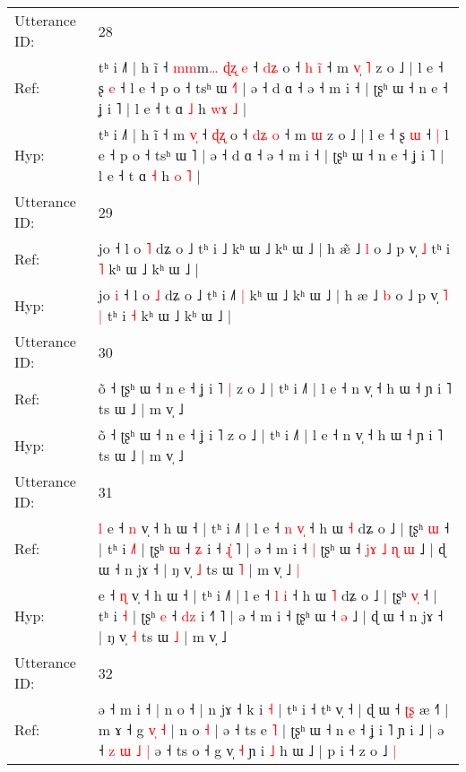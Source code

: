 \documentclass[10pt]{article}
\DeclareRobustCommand{\hl}[1]{{\textcolor{red}{#1}}}
\begin{document}
\begin{longtable}{ll}
 \\
\midrule
Utterance ID: & 28 \\
Ref: & tʰ i ˩˥ | h ĩ ˧ \hl{m}\hl{m}m\hl{…} \hl{ɖ}\hl{ʐ}\hl{ }\hl{e} ˧ \hl{d}\hl{ʑ} o ˧ \hl{h}\hl{ }\hl{i}\hl{̃} ˧ m\hl{ }\hl{v}\hl{̩} \hl{˥} z o ˩ | l e ˧ ʂ \hl{e} ˧\hl{}\hl{} l e ˧ p o ˧ tsʰ ɯ \hl{˧}˥ | ə ˧ d ɑ ˧ ə ˧ m i ˧ | ʈʂʰ ɯ ˧ n e ˧ ʝ i ˥ | l e ˧ t ɑ \hl{˩} h \hl{w}\hl{ɤ} \hl{˩} |
 \\
Hyp: & tʰ i ˩˥ | h ĩ ˧ \hl{}\hl{}m\hl{} \hl{}\hl{}\hl{v}\hl{̩} ˧ \hl{ɖ}\hl{ʐ} o ˧ \hl{d}\hl{ʑ}\hl{ }\hl{o} ˧ m\hl{}\hl{}\hl{} \hl{ɯ} z o ˩ | l e ˧ ʂ \hl{ɯ} ˧\hl{ }\hl{|} l e ˧ p o ˧ tsʰ ɯ \hl{}˥ | ə ˧ d ɑ ˧ ə ˧ m i ˧ | ʈʂʰ ɯ ˧ n e ˧ ʝ i ˥ | l e ˧ t ɑ \hl{˧} h \hl{}\hl{o} \hl{˥} |
 \\
\midrule
Utterance ID: & 29 \\
Ref: & jo\hl{}\hl{} ˧ l o \hl{˥} dʑ o ˩ tʰ i ˩\hl{}\hl{}\hl{} kʰ ɯ ˩ kʰ ɯ ˩ | h æ\hl{̃} ˩ \hl{l} o ˩ p v̩\hl{}\hl{} \hl{˩} tʰ i \hl{˥} kʰ ɯ ˩ kʰ ɯ ˩ |
 \\
Hyp: & jo\hl{ }\hl{i} ˧ l o \hl{˩} dʑ o ˩ tʰ i ˩\hl{˥}\hl{ }\hl{|} kʰ ɯ ˩ kʰ ɯ ˩ | h æ\hl{} ˩ \hl{b} o ˩ p v̩\hl{ }\hl{˥} \hl{|} tʰ i \hl{˧} kʰ ɯ ˩ kʰ ɯ ˩ |
 \\
\midrule
Utterance ID: & 30 \\
Ref: & õ ˧ ʈʂʰ ɯ ˧ n e ˧ ʝ i ˥\hl{ }\hl{|} z o ˩ | tʰ i ˩˥ | l e ˧ n v̩ ˧ h ɯ ˧ ɲ i ˥ ts ɯ ˩ | m v̩ ˩
 \\
Hyp: & õ ˧ ʈʂʰ ɯ ˧ n e ˧ ʝ i ˥\hl{}\hl{} z o ˩ | tʰ i ˩˥ | l e ˧ n v̩ ˧ h ɯ ˧ ɲ i ˥ ts ɯ ˩ | m v̩ ˩
 \\
\midrule
Utterance ID: & 31 \\
Ref: & \hl{l}\hl{ }e ˧ \hl{n} v̩ ˧ h ɯ ˧ | tʰ i ˩˥ | l e ˧ \hl{n} \hl{v}\hl{̩} ˧ h ɯ \hl{˧} dʑ o ˩ | ʈʂʰ \hl{}\hl{ɯ} ˧ | tʰ i \hl{˩}\hl{˥} | ʈʂʰ \hl{ɯ} ˧ \hl{}\hl{ʑ} i ˧\hl{ }\hl{ɻ}\hl{̍} ˥ | ə ˧ m i ˧\hl{ }\hl{|} ʈʂʰ ɯ ˧\hl{ }\hl{j}\hl{ɤ}\hl{ }\hl{˩}\hl{ }\hl{ɳ} \hl{ɯ} ˩ | ɖ ɯ ˧ n jɤ ˧ | ŋ v̩ \hl{˩} ts ɯ \hl{˥} | m v̩ ˩\hl{ }\hl{|}
 \\
Hyp: & \hl{}\hl{}e ˧ \hl{ɳ} v̩ ˧ h ɯ ˧ | tʰ i ˩˥ | l e ˧ \hl{l} \hl{}\hl{i} ˧ h ɯ \hl{˥} dʑ o ˩ | ʈʂʰ \hl{v}\hl{̩} ˧ | tʰ i \hl{}\hl{˧} | ʈʂʰ \hl{e} ˧ \hl{d}\hl{z} i ˧\hl{}\hl{}\hl{˥} ˥ | ə ˧ m i ˧\hl{}\hl{} ʈʂʰ ɯ ˧\hl{}\hl{}\hl{}\hl{}\hl{}\hl{}\hl{} \hl{ə} ˩ | ɖ ɯ ˧ n jɤ ˧ | ŋ v̩ \hl{˧} ts ɯ \hl{˩} | m v̩ ˩\hl{}\hl{}
 \\
\midrule
Utterance ID: & 32 \\
Ref: & ə ˧ m i ˧ | n o ˧ | n jɤ ˧ k i \hl{˧} | tʰ i ˧ tʰ v̩ ˧ | ɖ ɯ ˧ \hl{ʈ}\hl{ʂ} æ ˧˥ | m ɤ ˧ g\hl{ }\hl{v}\hl{̩} \hl{˧} | n o \hl{˧} | ə ˧ ts e \hl{˥} | ʈʂʰ ɯ ˧ n e ˧ ʝ i ˥ ɲ i ˩ | ə ˧ \hl{z}\hl{ }\hl{ɯ} \hl{˩} \hl{|} ə ˧ ts o ˧ g v̩ \hl{˧} ɲ i \hl{˩} h ɯ ˩ | p i ˧ z o ˩ \hl{}\hl{|}

\end{longtable}
\end{document}
